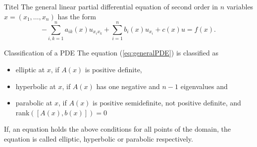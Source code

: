 
\begin{defn}{Titel}
	The general linear partial differential equation of second order in $n$ variables $x=(x_1,\ldots,x_n)$ has the form
	\begin{equation}
		-\sum_{ i, k = 1 }^n a_{ ik } (x) u_{ x_i x_k } + \sum_{ i = 1 }^n b_i (x) u_{ x_i } + c (x) u = f (x).
		\label{eq:generalPDE}
	\end{equation}
\end{defn}

\begin{defn}{Classification of a PDE}
	The equation (\ref{eq:generalPDE}) is classified as
		\begin{itemize}
			\item elliptic at $x$, if $A(x)$ is positive definite,
			\item hyperbolic at $x$, if $A(x)$ has one negative and $n-1$ eigenvalues and
			\item parabolic at $x$, if $A(x)$ is positive semidefinite, not positive definite, and rank$([A(x), b(x)])=0$  
		\end{itemize}
	
	If, an equation holds the above conditions for all points of the domain, the equation is called elliptic, hyperbolic or parabolic respectively. 
	\end{defn}